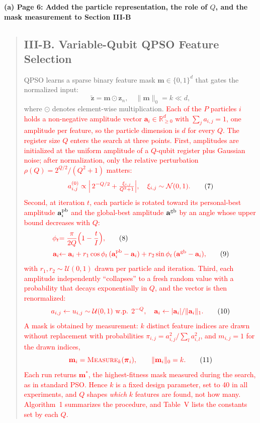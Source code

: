 \documentclass[11pt]{article}
\newenvironment{excerpt}{\begin{quote}\sloppy}{\end{quote}}
\newcommand{\mshead}[2]{\subsection*{\textbf{#1. #2}}}
\newcommand{\loc}[1]{\par\medskip\noindent\textbf{#1}\par}
\begin{document}
\loc{(a) Page 6: Added the particle representation, the role of $Q$, and the mask measurement to Section III-B}
\begin{excerpt}
\mshead{III-B}{Variable-Qubit QPSO Feature Selection}


QPSO learns a sparse binary feature mask
$\mathbf{m}\in\{0,1\}^d$ that gates the normalized input:
\begin{equation}
\tilde{\mathbf{z}} = \mathbf{m}\odot\mathbf{z}_n,\quad
\|\mathbf{m}\|_0 = k \ll d,
\tag{6}
\end{equation}
where $\odot$ denotes element-wise multiplication.
\textcolor{red}{Each of the $P$ particles $i$ holds a
non-negative amplitude vector $\mathbf{a}_i\in\mathbb{R}_{\ge 0}^{d}$
with $\sum_j a_{i,j}=1$, one amplitude per feature, so the particle
dimension is $d$ for every $Q$. The register size $Q$ enters the
search at three points. First, amplitudes are initialized at the
uniform amplitude of a $Q$-qubit register plus Gaussian noise; after
normalization, only the relative perturbation
$\rho(Q)=2^{Q/2}/(Q^{2}+1)$ matters:}
\begin{equation}
\textcolor{red}{a_{i,j}^{(0)} \propto \Bigl|\,2^{-Q/2} +
\tfrac{\xi_{i,j}}{Q^{2}+1}\Bigr|,\quad
\xi_{i,j}\sim\mathcal{N}(0,1).}
\tag{7}
\end{equation}
\textcolor{red}{Second, at iteration $t$, each particle is
rotated toward its personal-best amplitude $\mathbf{a}_i^{\rm pb}$
and the global-best amplitude $\mathbf{a}^{\rm gb}$ by an angle whose
upper bound decreases with $Q$:}
\begin{align}
\textcolor{red}{\phi_t} &\textcolor{red}{= \frac{\pi}{2Q}\Bigl(1-\frac{t}{I}\Bigr),}
\tag{8}\\
\textcolor{red}{\mathbf{a}_i} &\textcolor{red}{\leftarrow \mathbf{a}_i
+ r_1\cos\phi_t\,(\mathbf{a}_i^{\rm pb}-\mathbf{a}_i)
+ r_2\sin\phi_t\,(\mathbf{a}^{\rm gb}-\mathbf{a}_i),}
\tag{9}
\end{align}
\textcolor{red}{with $r_1,r_2\sim\mathcal{U}(0,1)$ drawn per
particle and iteration. Third, each amplitude independently
``collapses'' to a fresh random value with a probability that decays
exponentially in $Q$, and the vector is then renormalized:}
\begin{equation}
\textcolor{red}{a_{i,j} \leftarrow u_{i,j}\sim\mathcal{U}(0,1)
\ \text{w.p. } 2^{-Q},\quad
\mathbf{a}_i \leftarrow |\mathbf{a}_i| / \|\mathbf{a}_i\|_1 .}
\tag{10}
\end{equation}
\textcolor{red}{A mask is obtained by measurement: $k$
distinct feature indices are drawn without replacement with
probabilities $\pi_{i,j}=a_{i,j}^{2}/\sum_{l}a_{i,l}^{2}$, and
$m_{i,j}=1$ for the drawn indices,}
\begin{equation}
\textcolor{red}{\mathbf{m}_i = \textsc{Measure}_k(\boldsymbol{\pi}_i),
\qquad \|\mathbf{m}_i\|_0 = k .}
\tag{11}
\end{equation}
\textcolor{red}{Each run returns $\mathbf{m}^{*}$, the
highest-fitness mask measured during the search, as in standard PSO.
Hence $k$ is a fixed design parameter, set to 40 in all experiments,
and $Q$ shapes \emph{which} $k$ features are found, not how many.
Algorithm~1 summarizes the procedure, and
Table~V lists the constants set by each $Q$.}
\end{excerpt}
\end{document}
